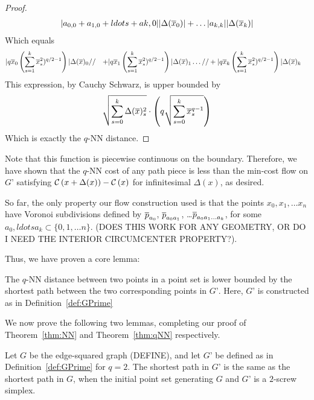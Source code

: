 \begin{proof}
\begin{align}
|a_{0, 0} + a_{1, 0} + ldots + a{k, 0}| |\Delta(\overline{x}_0)|
+ \ldots
|a_{k, k}| |\Delta(\overline{x}_k)|
\end{align}
Which equals
\begin{align}
&|q\overline{x}_0\left(\sum_{s=1}^k \overline{x}_s^2)^{q/2-1}\right)| \Delta(\overline{x})_0
//&+
|q\overline{x}_1\left(\sum_{s=1}^k \overline{x}_s^2)^{q/2-1}\right)| \Delta(\overline{x})_1
\ldots
//& +
|q\overline{x}_k\left(\sum_{s=1}^k \overline{x}_s^2)^{q/2-1}\right)| \Delta(\overline{x})_k
\end{align}
This expression, by Cauchy Schwarz, is upper bounded by
\[
\sqrt{\sum_{s=0}^k \Delta(\overline{x})_s^2} \cdot \left(q\sqrt{\sum_{s=0}^k
\overline{x}_s^{q-1}}\right)
\]
Which is exactly the $q$-NN distance.

\end{proof}

Note that this function is piecewise continuous on the boundary. Therefore,
we have shown that the $q$-NN cost of any path piece is less than the
min-cost flow on $G’$ satisfying
$\mathcal{C}\left(x+\Delta(x)\right)-\mathcal{C}\left(x\right)$ for infinitesimal
$\Delta(x)$, as desired.

So far, the only property our flow construction used is that the points
$x_0, x_1, \ldots x_n$ have Voronoi subdivisions defined by $\overline{p}_{a_0}$,
$\overline{p}_{a_0a_1}$, \ldots $\overline{p}_{a_0a_1\ldots a_k}$, for some $a_0, ldots a_k
\subset \{0, 1, \ldots n\}$. (DOES THIS WORK FOR ANY GEOMETRY, OR DO I NEED
THE INTERIOR CIRCUMCENTER PROPERTY?).

Thus, we have proven a core lemma:

\begin{lemma}\label{lem:qNN-GPrime}

The $q$-NN distance between two points in a point set is lower bounded by
the shortest path between the two corresponding points in $G’$. Here, $G’$
is constructed as in Definition~\ref{def:GPrime}

\end{lemma}

We now prove the following two lemmas, completing our proof of
Theorem~\ref{thm:NN} and Theorem~\ref{thm:qNN} respectively.

\begin{lemma}\label{lem:edge-squared-GPrime} Let $G$ be the edge-squared graph
(DEFINE), and let $G’$ be defined as in Definition~\ref{def:GPrime} for $q=2$.
The shortest path in $G’$ is the same as the shortest path in $G$, when the
initial point set generating $G$ and $G’$ is a $2$-screw simplex.

\end{lemma}

